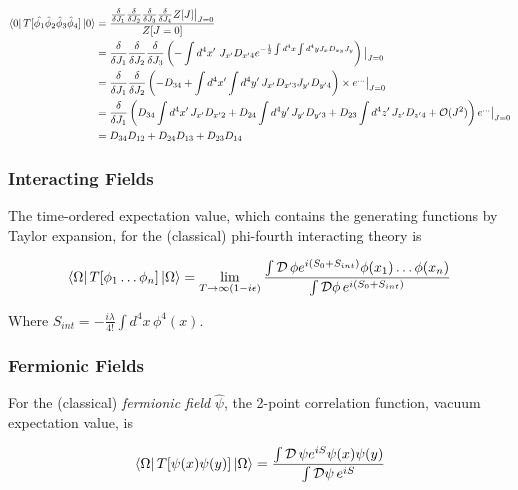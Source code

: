 \begin{align}
\bra{0} T[ \hat{\phi_1} \hat{\phi}_2 \hat{\phi}_3 \hat{\phi}_4 ] \ket{0} &= \frac{ \frac{\delta}{\delta J_1} \frac{\delta}{\delta J_2} \frac{\delta}{\delta J_3} \frac{\delta}{\delta J_4}  Z[J] \big{|}_{J=0} }{ Z[J=0] } \\
&= \frac{\delta}{\delta J_1} \frac{\delta}{\delta J_2} \frac{\delta}{\delta J_3} \left( - \int d^4 x' \,\, J_{x'} D_{x' 4} e^{-\frac{1}{2} \int d^4 x \int d^4 y J_x D_{xy} J_y} \right) \big{|}_{J=0}  \\
&= \frac{\delta}{\delta J_1} \frac{\delta}{\delta J_2} \left( -D_{34} + \int d^4 x' \int d^4 y' \, J_{x'} D_{x' 3} J_{y'} D_{y' 4} \right) \times e^{\dots} \big{|}_{J=0}   \\
&= \frac{\delta}{\delta J_1} \left( D_{34} \int d^4 x' \, J_{x'} D_{x' 2} + D_{24} \int d^4 y' \, J_{y'} D_{y' 3} + D_{23} \int d^4 z' \, J_{z'} D_{z' 4} + \mathcal{O} (J^2) \right) e^{\dots} \big{|}_{J=0}  \\
&= D_{34} D_{12} + D_{24} D_{13} + D_{23} D_{14}
\end{align}

\subsubsection*{Interacting Fields}

\noindent The time-ordered expectation value, which contains the generating functions by Taylor expansion, for the (classical) phi-fourth interacting theory is 

\begin{equation}
\bra{\Omega} T[ \phi_1 \dots \phi_n] \ket{\Omega} = \lim_{T \rightarrow \infty (1-i \epsilon )} \frac{ \int \mathcal{D} \, \phi e^{i(S_0 + S_{int})} \phi (x_1) \dots \phi (x_n) }{\int \mathcal{D} \phi \, e^{i(S_0 + S_{int})}}
\end{equation}

\noindent Where $S_{int} = -\frac{i \lambda}{4!} \int d^4 x \, \phi^4 (x)$. \\

\subsubsection*{Fermionic Fields}

\noindent For the (classical) \textit{fermionic field} $\hat{\psi}$, the 2-point correlation function, vacuum expectation value, is

\begin{equation}
\bra{\Omega} T[ \psi (x) \psi (y)] \ket{\Omega} = \frac{ \int \mathcal{D} \, \psi e^{iS} \psi (x) \psi (y) }{\int \mathcal{D} \psi \, e^{iS}}
\end{equation}

